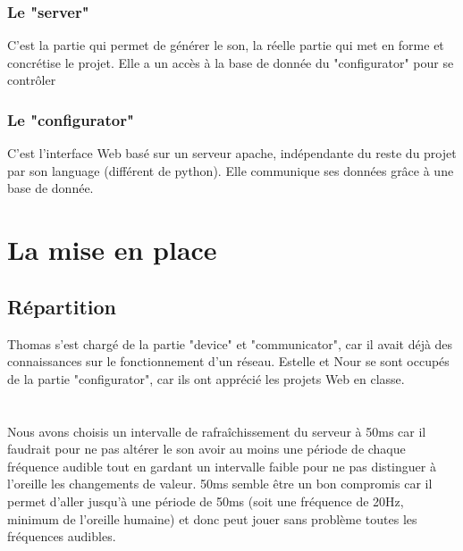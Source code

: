\documentclass[12pt]{article}
\begin{document}
	\subsubsection{Le "server"}
	C'est la partie qui permet de générer le son, la réelle partie qui met en forme et concrétise le projet. Elle a un accès à la base de donnée du "configurator" pour se contrôler
	\subsubsection{Le "configurator"}
	C'est l'interface Web basé sur un serveur apache, indépendante du reste du projet par son language (différent de python). Elle communique ses données grâce à une base de donnée. 
	\section{La mise en place}
	\subsection{Répartition}
	Thomas s'est chargé de la partie "device" et "communicator", car il avait déjà des connaissances sur le fonctionnement d'un réseau. Estelle et Nour se sont occupés de la partie "configurator", car ils ont apprécié les projets Web en classe.
	\section{}
	Nous avons choisis un intervalle de rafraîchissement du serveur à 50ms car il faudrait pour ne pas altérer le son avoir au moins une période de chaque fréquence audible tout en gardant un intervalle faible pour ne pas distinguer à l'oreille les changements de valeur. 50ms semble être un bon compromis car il permet d'aller jusqu'à une période de 50ms (soit une fréquence de 20Hz, minimum de l'oreille humaine) et donc peut jouer sans problème toutes les fréquences audibles.
\end{document}
